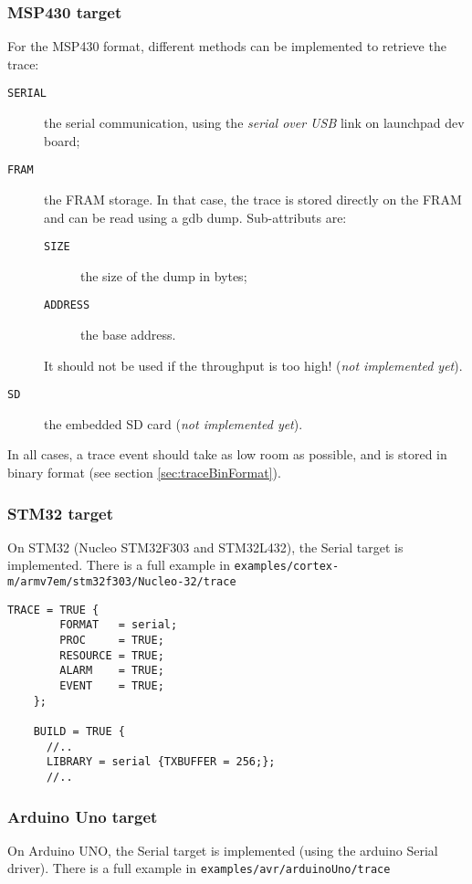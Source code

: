 \subsubsection{MSP430 target}
For the MSP430 format, different methods can be implemented to retrieve the trace:
\begin{description}
	\item[\texttt{SERIAL}] the serial communication, using the \emph{serial over USB} link on launchpad dev board;
	\item[\texttt{FRAM}] the FRAM storage. In that case, the trace is stored directly on the FRAM and can be read using a gdb dump. Sub-attributs are:
\begin{description}
	\item[\texttt{SIZE}] the size of the dump in bytes;
	\item[\texttt{ADDRESS}] the base address.
\end{description} It should not be used if the throughput is too high!
(\emph{not implemented yet}).

	\item[\texttt{SD}] the embedded SD card (\emph{not implemented yet}).
\end{description}

In all cases, a trace event should take as low room as possible, and is stored in binary format (see section \ref{sec:traceBinFormat}).

\subsubsection{STM32 target}
On STM32 (Nucleo STM32F303 and STM32L432), the Serial target is implemented. There is a full example in \texttt{examples/cortex-m/armv7em/stm32f303/Nucleo-32/trace}

\begin{lstlisting}[language=OIL]
    TRACE = TRUE {
        FORMAT   = serial;
        PROC     = TRUE;
        RESOURCE = TRUE;
        ALARM    = TRUE;
        EVENT    = TRUE;
    };
    
    BUILD = TRUE {
	  //..
      LIBRARY = serial {TXBUFFER = 256;};
	  //..

\end{lstlisting}

\subsubsection{Arduino Uno target}
On Arduino UNO, the Serial target is implemented (using the arduino Serial driver).
There is a full example in \texttt{examples/avr/arduinoUno/trace}


